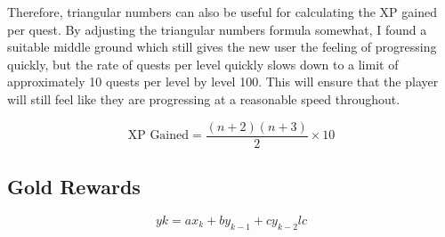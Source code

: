 Therefore, triangular numbers can also be useful for calculating the XP gained per quest. By adjusting the triangular numbers formula somewhat, I found a suitable middle ground which still gives the new user the feeling of progressing quickly, but the rate of quests per level quickly slows down to a limit of approximately 10 quests per level by level 100.
This will ensure that the player will still feel like they are progressing at a reasonable speed throughout.

\begin{equation} \label{eq:xpgainedtriangular}
	\textrm{XP Gained} = \frac{(n+2)(n+3)}{2} \times 10
\end{equation}

\begin{center}
\end{center}

\subsection{Gold Rewards}
\begin{equation} \label{eq:openloopreward}
	yk = ax_k + by_{k-1} + cy_{k-2}lc
\end{equation}
